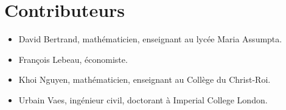 \section*{Contributeurs}

\begin{itemize}
    \item David Bertrand, mathématicien, enseignant au lycée Maria Assumpta.
    \item François Lebeau, économiste.
    \item Khoi Nguyen, mathématicien, enseignant au Collège du Christ-Roi.
    \item Urbain Vaes, ingénieur civil, doctorant à Imperial College London.
\end{itemize}
